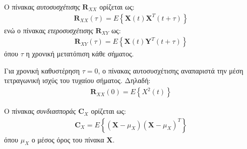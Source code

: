 \begin{definition} \label{def:1.16}
Ο πίνακας \emph{αυτοσυσχέτισης} \en $\mathbf{R}_{XX}$ \gr ορίζεται ως: \en
\begin{align*}
    \mathbf{R}_{XX}(\tau) = E\left\{\mathbf{X}(t) \mathbf{X}^T(t+\tau) \right\}
\end{align*}
\en ενώ ο πίνακας \emph{ετεροσυσχέτισης} \en $\mathbf{R}_{XY} $ \gr ως:
\begin{align*}
    \mathbf{R}_{XY}(\tau) = E\left\{\mathbf{X}(t) \mathbf{Y}^T(t+\tau) \right\}
\end{align*}
\gr όπου $τ$ η χρονική μετατόπιση κάθε σήματος.
\end{definition}
\begin{proposition} \label{prop:1.6}
Για χρονική καθυστέρηση $τ=0$, ο πίνακας αυτοσυσχέτισης αναπαριστά την μέση τετραγωνική ισχύς του τυχαίου σήματος. Δηλαδή:
\begin{align*}
    \mathbf{R}_{XX}(0) = E\left \{ X^2(t) \right \}
\end{align*}
\end{proposition}
\begin{definition} \label{def:1.17}
Ο πίνακας \emph{συνδιασποράς} \en $\mathbf{C}_{X}$ \gr ορίζεται ως: \en
\begin{align*}
    \mathbf{C}_{X} = E\left \{ (\mathbf{X} - \mu_{X}) (\mathbf{X} - \mu_{X})^T \right \}
\end{align*}
\gr όπου \en $\mu_X$ \gr ο μέσος όρος του πίνακα \en $\mathbf{X} $. \gr
\end{definition}

